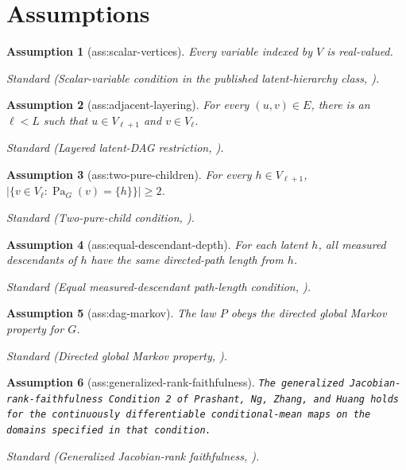 \documentclass{article}
\newtheorem{assumption}{Assumption}
\begin{document}
\section{Assumptions}

\begin{assumption}[ass:scalar-vertices]\label{ass:scalar-vertices}
Every variable indexed by \(V\) is real-valued.
\par\smallskip\noindent\emph{Standard} (Scalar-variable condition in the published latent-hierarchy class, \cite{PrashantEtAl2025Differentiable}).
\end{assumption}

\begin{assumption}[ass:adjacent-layering]\label{ass:adjacent-layering}
For every \((u,v)\in E\), there is an \(\ell<L\) such that \(u\in V_{\ell+1}\) and \(v\in V_\ell\).
\par\smallskip\noindent\emph{Standard} (Layered latent-DAG restriction, \cite{PrashantEtAl2025Differentiable}).
\end{assumption}

\begin{assumption}[ass:two-pure-children]\label{ass:two-pure-children}
For every \(h\in V_{\ell+1}\), \(|\{v\in V_\ell:\operatorname{Pa}_G(v)=\{h\}\}|\ge 2\).
\par\smallskip\noindent\emph{Standard} (Two-pure-child condition, \cite{PrashantEtAl2025Differentiable}).
\end{assumption}

\begin{assumption}[ass:equal-descendant-depth]\label{ass:equal-descendant-depth}
For each latent \(h\), all measured descendants of \(h\) have the same directed-path length from \(h\).
\par\smallskip\noindent\emph{Standard} (Equal measured-descendant path-length condition, \cite{PrashantEtAl2025Differentiable}).
\end{assumption}

\begin{assumption}[ass:dag-markov]\label{ass:dag-markov}
The law \(P\) obeys the directed global Markov property for \(G\).
\par\smallskip\noindent\emph{Standard} (Directed global Markov property, \cite{PrashantEtAl2025Differentiable}).
\end{assumption}

\begin{assumption}[ass:generalized-rank-faithfulness]\label{ass:generalized-rank-faithfulness}
\texttt{The generalized Jacobian-\allowbreak{}rank-\allowbreak{}faithfulness Condition 2 of Prashant,\allowbreak{} Ng,\allowbreak{} Zhang,\allowbreak{} and Huang holds for the continuously differentiable conditional-\allowbreak{}mean maps on the domains specified in that condition.}
\par\smallskip\noindent\emph{Standard} (Generalized Jacobian-rank faithfulness, \cite{PrashantEtAl2025Differentiable}).
\end{assumption}
\end{document}
